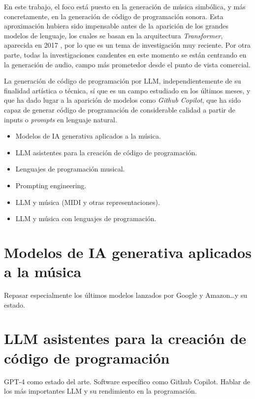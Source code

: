 En este trabajo, el foco está puesto en la generación de música simbólica, y más concretamente, en la generación de código de programación sonora. Esta aproximación hubiera sido impensable antes de la aparición de los grandes modelos de lenguaje, los cuales se basan en la arquitectura \textit{Transformer}, aparecida en 2017 \cite{vaswaniAttentionAllYou2017}, por lo que es un tema de investigación muy reciente. Por otra parte, todas la investigaciones candentes en este momento se están centrando en la generación de audio, campo más prometedor desde el punto de vista comercial. 

La generación de código de programación por LLM, independientemente de su finalidad artística o técnica, sí que es un campo estudiado en los últimos meses, y que ha dado lugar a la aparición de modelos como \textit{Github Copilot}, que ha sido capaz de generar código de programación de considerable calidad a partir de inputs o \textit{prompts} en lenguaje natural.
 


\begin{itemize}
    \item Modelos de IA generativa aplicados a la música.
    \item LLM asistentes para la creación de código de programación.
    \item Lenguajes de programación musical.
    \item Prompting engineering.
    \item LLM y música (MIDI y otras representaciones).
    \item LLM y música con lenguajes de programación.
\end{itemize}

\section{Modelos de IA generativa aplicados a la música}
    Repasar especialmente los últimos modelos lanzados por Google y Amazon\dots y su estado.

\section{LLM asistentes para la creación de código de programación}
\label{sec:llm_asistentes_creacion_codigo_programacion}
    GPT-4 como estado del arte. Software específico como Github Copilot. Hablar de los más importantes LLM y su rendimiento en la programación.


